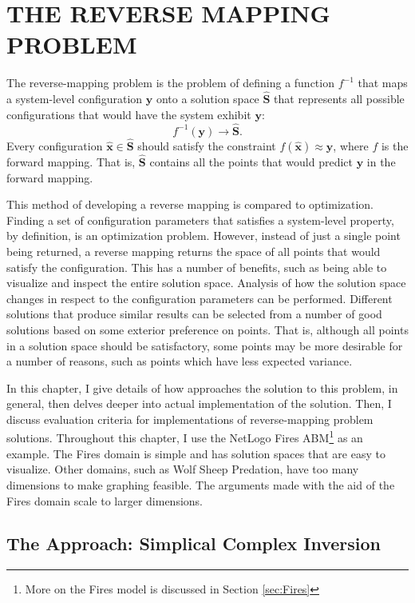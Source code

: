 \chapter{THE REVERSE MAPPING PROBLEM}
\thispagestyle{plain}

\label{ReverseMapping}

The reverse-mapping problem is the problem of defining a function $f^{-1}$ that maps a system-level configuration $\mathbf y$ onto a solution space $\hat{\mathbf S}$ that represents all possible configurations that would have the system exhibit $\mathbf y$:
   \[ f^{-1}(\mathbf y) \rightarrow \hat{\mathbf S}. \]
Every configuration $\hat {\mathbf x} \in \hat {\mathbf S}$ should satisfy the constraint $f(\hat{\mathbf x}) \approx \mathbf y$, where $f$ is the forward mapping.
That is, $\hat{\mathbf S}$ contains all the points that would predict $\mathbf y$ in the forward mapping.

This method of developing a reverse mapping is compared to optimization.
Finding a set of configuration parameters that satisfies a system-level property, by definition, is an optimization problem.
However, instead of just a single point being returned, a reverse mapping returns the space of all points that would satisfy the configuration.
This has a number of benefits, such as being able to visualize and inspect the entire solution space.
Analysis of how the solution space changes in respect to the configuration parameters can be performed.
Different solutions that produce similar results can be selected from a number of good solutions based on some exterior preference on points.
That is, although all points in a solution space should be satisfactory, some points may be more desirable for a number of reasons, such as points which have less expected variance.

In this chapter, I give details of how \fw approaches the solution to this problem, in general, then delves deeper into actual implementation of the solution.
Then, I discuss evaluation criteria for implementations of reverse-mapping problem solutions.
Throughout this chapter, I use the NetLogo Fires ABM\footnote{More on the Fires model is discussed in Section \ref{sec:Fires}} as an example.
The Fires domain is simple and has solution spaces that are easy to visualize.
Other domains, such as Wolf Sheep Predation, have too many dimensions to make graphing feasible.
The arguments made with the aid of the Fires domain scale to larger dimensions.



\section{The \fw Approach: Simplical Complex Inversion}

